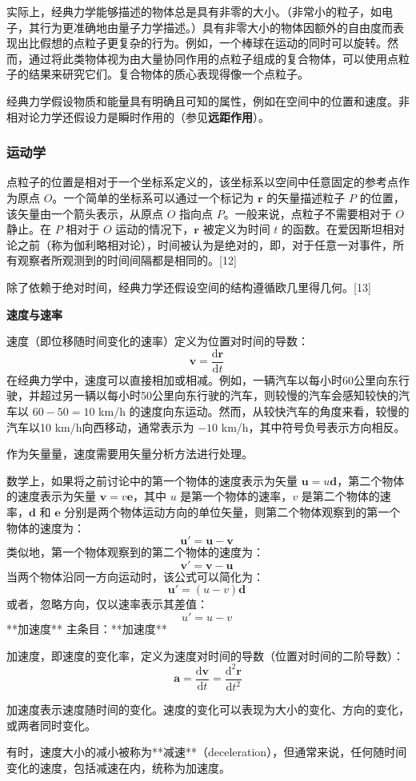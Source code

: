 实际上，经典力学能够描述的物体总是具有非零的大小。（非常小的粒子，如电子，其行为更准确地由量子力学描述。）具有非零大小的物体因额外的自由度而表现出比假想的点粒子更复杂的行为。例如，一个棒球在运动的同时可以旋转。然而，通过将此类物体视为由大量协同作用的点粒子组成的复合物体，可以使用点粒子的结果来研究它们。复合物体的质心表现得像一个点粒子。

经典力学假设物质和能量具有明确且可知的属性，例如在空间中的位置和速度。非相对论力学还假设力是瞬时作用的（参见\textbf{远距作用}）。
\subsubsection{运动学}  
点粒子的位置是相对于一个坐标系定义的，该坐标系以空间中任意固定的参考点作为原点 \( O \)。一个简单的坐标系可以通过一个标记为 \( \mathbf{r} \) 的矢量描述粒子 \( P \) 的位置，该矢量由一个箭头表示，从原点 \( O \) 指向点 \( P \)。一般来说，点粒子不需要相对于 \( O \) 静止。在 \( P \) 相对于 \( O \) 运动的情况下，\( \mathbf{r} \) 被定义为时间 \( t \) 的函数。在爱因斯坦相对论之前（称为伽利略相对论），时间被认为是绝对的，即，对于任意一对事件，所有观察者所观测到的时间间隔都是相同的。[12]  

除了依赖于绝对时间，经典力学还假设空间的结构遵循欧几里得几何。[13]

\textbf{速度与速率}  
 
速度（即位移随时间变化的速率）定义为位置对时间的导数：  
\[
\mathbf{v} = \frac{\mathrm{d} \mathbf{r}}{\mathrm{d} t}~
\]  
在经典力学中，速度可以直接相加或相减。例如，一辆汽车以每小时60公里向东行驶，并超过另一辆以每小时50公里向东行驶的汽车，则较慢的汽车会感知较快的汽车以 \( 60 - 50 = 10 \) km/h 的速度向东运动。然而，从较快汽车的角度来看，较慢的汽车以10 km/h向西移动，通常表示为 \(-10 \) km/h，其中符号负号表示方向相反。  

作为矢量量，速度需要用矢量分析方法进行处理。

数学上，如果将之前讨论中的第一个物体的速度表示为矢量 \(\mathbf{u} = u \mathbf{d}\)，第二个物体的速度表示为矢量 \(\mathbf{v} = v \mathbf{e}\)，其中 \(u\) 是第一个物体的速率，\(v\) 是第二个物体的速率，\(\mathbf{d}\) 和 \(\mathbf{e}\) 分别是两个物体运动方向的单位矢量，则第二个物体观察到的第一个物体的速度为：
\[
\mathbf{u}' = \mathbf{u} - \mathbf{v}~
\]
类似地，第一个物体观察到的第二个物体的速度为：
\[
\mathbf{v}' = \mathbf{v} - \mathbf{u}~
\]
当两个物体沿同一方向运动时，该公式可以简化为：
\[
\mathbf{u}' = (u - v) \mathbf{d}~
\]
或者，忽略方向，仅以速率表示其差值：
\[
u' = u - v~
\]
**加速度**  
主条目：**加速度**  

加速度，即速度的变化率，定义为速度对时间的导数（位置对时间的二阶导数）：  
\[
\mathbf{a} = \frac{\mathrm{d} \mathbf{v}}{\mathrm{d} t} = \frac{\mathrm{d}^2 \mathbf{r}}{\mathrm{d} t^2}
\]  

加速度表示速度随时间的变化。速度的变化可以表现为大小的变化、方向的变化，或两者同时变化。  

有时，速度大小的减小被称为**减速**（deceleration），但通常来说，任何随时间变化的速度，包括减速在内，统称为加速度。